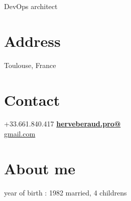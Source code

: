 \documentclass[]{friggeri-cv}
\begin{document}
    {DevOps architect}


\begin{aside}
    \section{Address}
        Toulouse, France
        ~
    \section{Contact}
        +33.661.840.417
        \href{mailto:herveberaud.pro@gmail.com}{\textbf{herveberaud.pro@}\\gmail.com}
        ~
    \section{About me}
        year of birth : 1982
        married, 4 childrens 
        ~

\end{aside}
\end{document}
